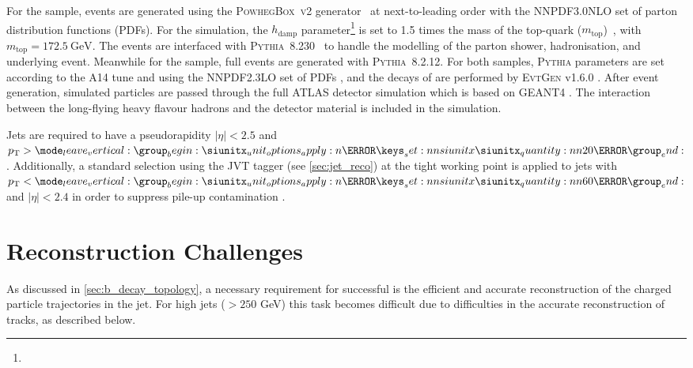 
For the \ttbar sample, events are generated using the \textsc{PowhegBox}~\textsc{v2} generator~\cite{powheg2004, powheg2007, powheg2007_2, powheg2010} at next-to-leading order with the NNPDF3.0NLO \cite{Ball:2014uwa} set of parton distribution functions (PDFs).
For the \ttbar simulation, the $h_\text{damp}$ parameter\footnote{\hdampFootnote} is set to 1.5 times the mass of the top-quark ($m_\text{top}$)~\cite{ATL-PHYS-PUB-2016-020}, with $m_\text{top} = \SI{172.5}{\GeV}$.
The events are interfaced with \textsc{Pythia}~8.230~\cite{Sjostrand:2014zea} to handle the modelling of the parton shower, hadronisation, and underlying event.
Meanwhile for the \Zprime sample, full events are generated with \textsc{Pythia}~8.2.12.
For both samples, \textsc{Pythia} parameters are set according to the A14 tune \cite{ATL-PHYS-PUB-2014-021} and using the NNPDF2.3LO set of PDFs \cite{Ball:2012cx}, and the decays of \bchadrons are performed by \textsc{EvtGen} v1.6.0 \cite{Lange:2001uf}.
After event generation, simulated particles are passed through the full ATLAS detector simulation \cite{SOFT-2010-01} which is based on GEANT4 \cite{Agostinelli:2002hh}.
The interaction between the long-flying heavy flavour hadrons and the detector material is included in the simulation.

Jets are required to have a pseudorapidity $|\eta| < 2.5$ and $\pt > \SI{20}{\GeV}$.
Additionally, a standard selection using the JVT tagger (see \cref{sec:jet_reco}) at the tight working point is applied to jets with $\pt < \SI{60}{\GeV}$ and $|\eta| < 2.4$ in order to suppress pile-up contamination \cite{ATLAS-CONF-2014-018}.




\section{\texorpdfstring{\bhadron}{b-hadron} Reconstruction Challenges}
\label{sec:b_had_reco_chall}

As discussed in \cref{sec:b_decay_topology}, a necessary requirement for successful \btagging is the efficient and accurate reconstruction of the charged particle trajectories in the jet.
For high \pT jets (\pT $> 250$ GeV) this task becomes difficult due to difficulties in the accurate reconstruction of tracks, as described below.

